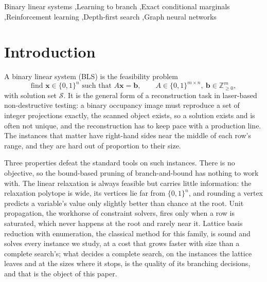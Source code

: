 \documentclass[final,5p,times,twocolumn,authoryear]{elsarticle}
\newcommand{\SOL}{\mathcal{S}}
\begin{document}
\begin{frontmatter}
\begin{abstract}
off and matches its time at the two larger sizes, while a complete solver with presolve and clause learning remains faster end to end; the gap is per-node cost, not tree size.
\end{abstract}

\begin{keyword}
Binary linear systems \sep Learning to branch \sep Exact conditional marginals \sep Reinforcement learning \sep Depth-first search \sep Graph neural networks
\end{keyword}

\end{frontmatter}

\section{Introduction}
\label{sec:intro}

A binary linear system (BLS) is the feasibility problem
\begin{equation}
\text{find } \mathbf{x}\in\{0,1\}^n \text{ such that } A\mathbf{x}=\mathbf{b},\qquad A\in\{0,1\}^{m\times n},\ \mathbf{b}\in\mathbb{Z}_{\ge0}^m,
\label{eq:bls}
\end{equation}
with solution set $\SOL$. It is the general form of a reconstruction task in laser-based non-destructive testing: a binary occupancy image must reproduce a set of integer projections exactly, the scanned object exists, so a solution exists and is often not unique, and the reconstruction has to keep pace with a production line. The instances that matter have right-hand sides near the middle of each row's range, and they are hard out of proportion to their size.

Three properties defeat the standard tools on such instances. There is no objective, so the bound-based pruning of branch-and-bound has nothing to work with. The linear relaxation is always feasible but carries little information: the relaxation polytope is wide, its vertices lie far from $\{0,1\}^n$, and rounding a vertex predicts a variable's value only slightly better than chance at the root. Unit propagation, the workhorse of constraint solvers, fires only when a row is saturated, which never happens at the root and rarely near it. Lattice basis reduction with enumeration, the classical method for this family, is sound and solves every instance we study, at a cost that grows faster with size than a complete search's; what decides a complete search, on the instances the lattice leaves and at the sizes where it stops, is the quality of its branching decisions, and that is the object of this paper.
\end{document}
